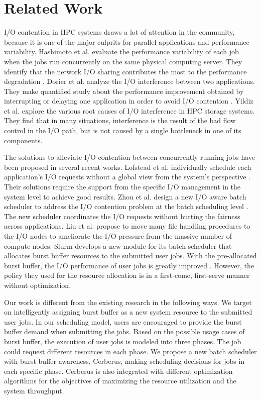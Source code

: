 \section{Related Work}
\label{Sec:RelatedWorks}

I/O contention in HPC systems draws a lot of attention in the community, 
because it is one of the major culprits for parallel applications and performance variability.
Hashimoto et al. evaluate the performance variability of each job 
when the jobs run concurrently on the same physical computing server. 
They identify that the network I/O sharing contributes the most to 
the performance degradation \cite{hashimoto:ICNC:2012}.  
Dorier et al. analyze the I/O interference between two applications. 
They make quantified study about the performance improvement obtained 
by interrupting or delaying one application in order to avoid I/O contention \cite{dorier:IPDPS:2014}.
Yildiz et al. \cite{yildiz:IPDPS:2016} explore the various root causes 
of I/O interference in HPC storage systems. 
They find that in many situations, interference is the result of the bad flow control in the I/O path, but is not caused by a single bottleneck in one of its components.

The solutions to alleviate I/O contention between concurrently 
running jobs have been proposed in several recent works.
Lofstead et al. individually schedule each application's I/O requests without 
a global view from the system's perspective \cite{lofstead:sc:2010}. 
Their solutions require the support from the specific I/O management 
in the system level to achieve good results. 
Zhou et al. design a new I/O aware batch scheduler to address the I/O 
contention problem at the batch scheduling level \cite{zhou:Cluster:2015}. 
The new scheduler coordinates the  I/O requests without hurting the fairness across applications. 
Liu et al. propose to move many file handling procedures to the I/O nodes to 
ameliorate the I/O pressure from the massive number of compute nodes\cite{Liu:MSST:2012}.
Slurm develops a new module for its batch scheduler that allocates burst buffer 
resources to the submitted user jobs. With the pre-allocated burst buffer, 
the I/O performance of user jobs is greatly improved \cite{SlurmBBGuide}.
However, the policy they used for the resource allocation is in a first-come, first-serve manner without optimization. 

Our work is different from the existing research in the following ways. 
We target on intelligently assigning burst buffer as a new system resource to the submitted user jobs.
In our scheduling model, users are encouraged to provide the burst buffer demand when submitting the jobs.
Based on the possible usage cases of burst buffer, the execution of user jobs is modeled into three phases. 
The job could request different resources in each phase.
We propose a new batch scheduler with burst buffer awareness, Cerberus, 
making scheduling decisions for jobs in each specific phase.
Cerberus is also integrated with different optimization algorithms for the objectives of maximizing the resource utilization and the system throughput.




